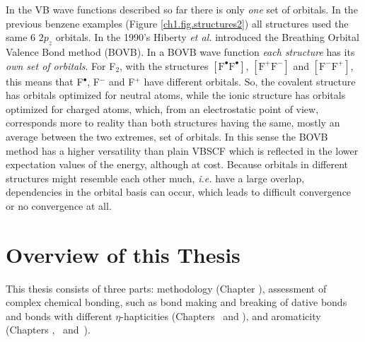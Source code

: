 In the VB wave functions described so far there is only \textit{one} set of orbitals. In the previous benzene examples (Figure \ref{ch1.fig.structures2}) all structures used the same 6 $2p_z$ orbitals. In the 1990's Hiberty \textit{et al.} introduced the Breathing Orbital Valence Bond method (BOVB). In a BOVB wave function \textit{each structure} has its \textit{own set of orbitals}. For F$_2$, with the structures $\mathrm{[F^\bullet F^\bullet]}$, $\mathrm{[F^{+} F^{-}]}$ and $\mathrm{[F^{-} F^{+}]}$, this means that F$^\bullet$, F$^{-}$ and F$^{+}$ have different orbitals. So, the covalent structure has orbitals optimized for neutral atoms, while the ionic structure has orbitals optimized for charged atoms, which, from an electrostatic point of view, corresponds more to reality than both structures having the same, mostly an average between the two extremes, set of orbitals. In this sense the BOVB method has a higher versatility than plain VBSCF which is reflected in the lower expectation values of the energy, although at cost. Because orbitals in different structures might resemble each other much, \textit{i.e.} have a large overlap, dependencies in the orbital basis can occur, which leads to difficult convergence or no convergence at all.

\section{Overview of this Thesis}

This thesis consists of three parts: methodology (Chapter \chorbopt), assessment of complex chemical bonding, such as bond making and breaking of dative bonds and bonds with different $\eta$-hapticities (Chapters \chdissociation\ and \chcyclopentadienyl), and aromaticity (Chapters \chhuckel, \chinorganic\ and~\chindacene).

